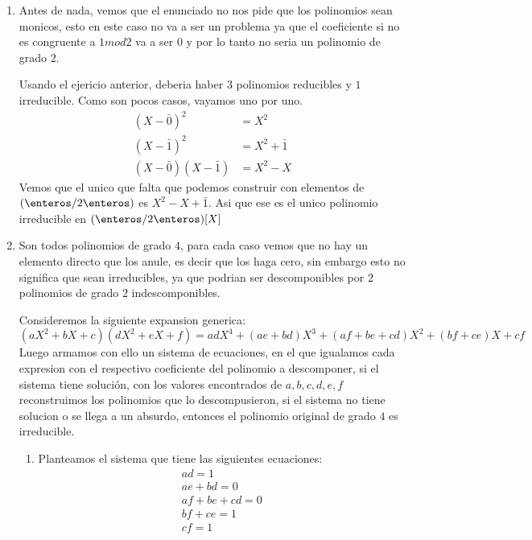 \begin{enumerate}[label=\roman*)]
  \item Antes de nada, vemos que el enunciado no nos pide que los polinomios sean monicos, esto en este caso no va a ser un problema ya que 
  el coeficiente si no es congruente a $1 mod 2$ va a ser 0 y por lo tanto no seria un polinomio de grado $2$.
  
  Usando el ejericio anterior, deberia haber $3$ polinomios reducibles y $1$ irreducible. Como son pocos casos, vayamos uno por uno. 
  \begin{align*}
  (X - \bar{0})^2 &= X^2 \\
  (X - \bar{1})^2 &= X^2 + \bar{1} \\
  (X - \bar{0})(X - \bar{1}) &= X^2 - X
  \end{align*}
  Vemos que el unico que falta que podemos construir con elementos de $(\enteros/2\enteros)$ es $X^2 - X + \bar{1}$. Asi que 
  ese es el unico polinomio irreducible en $(\enteros/2\enteros)[X]$
  
  \item Son todos polinomios de grado $4$, para cada caso vemos que no hay un elemento directo que los anule, es decir 
  que los haga cero, sin embargo esto no significa que sean irreducibles, ya que podrian ser descomponibles por $2$ polinomios de grado $2$ indescomponibles. 
  
  Consideremos la siguiente expansion generica:
  $$
  (aX^2 + bX + c)(dX^2 + eX + f) = adX^4 + (ae + bd)X^3 + (af + be + cd)X^2 + (bf + ce)X + cf
  $$
  Luego armamos con ello un sistema de ecuaciones, en el que igualamos cada expresion con el respectivo coeficiente del polinomio 
  a descomponer, si el sistema tiene solución, con los valores encontrados de $a,b,c,d,e,f$ reconstruimos los polinomios que lo descompusieron,
  si el sistema no tiene solucion o se llega a un absurdo, entonces el polinomio original de grado $4$ es irreducible.
        \begin{enumerate}[label=(\alph*)]
          \item Planteamos el sistema que tiene las siguientes ecuaciones:
          \begin{align}
          ad = 1 \\
          ae + bd = 0 \\
          af + be + cd = 0 \\
          bf + ce = 1 \\
          cf = 1
          \end{align}


\end{enumerate}
\end{enumerate}
